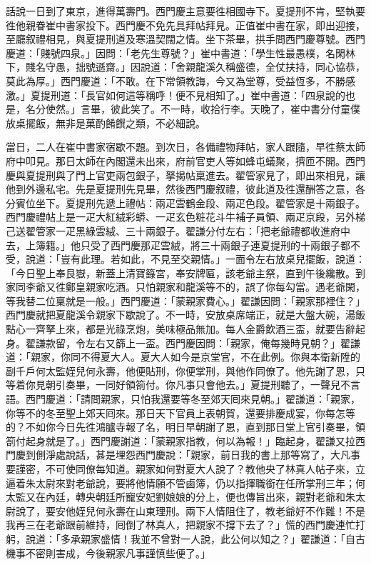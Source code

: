 話說一日到了東京，進得萬壽門。西門慶主意要徃相國寺下。夏提刑不肯，堅執要徃他親眷崔中書家投下。西門慶不免先具拜帖拜見。正值崔中書在家，即出迎接，至廳叙禮相見，與夏提刑道及寒溫契闊之情。坐下茶畢，拱手問西門慶尊號。西門慶道：「賤號四泉。」因問：「老先生尊號？」崔中書道：「學生性最愚樸，名閑林下，賤名守愚，拙號遜齋。」因說道：「舍親龍溪久稱盛德，全仗扶持，同心協恭，莫此為厚。」西門慶道：「不敢。在下常領教誨，今又為堂尊，受益恆多，不勝感激。」夏提刑道：「長官如何這等稱呼！便不見相知了。」崔中書道：「四泉說的也是，名分使然。」言畢，彼此笑了。不一時，收拾行李。天晚了，崔中書分付童僕放桌擺飯，無非是菓酌餚饌之類，不必細說。

當日，二人在崔中書家宿歇不題。到次日，各備禮物拜帖，家人跟隨，早徃蔡太師府中叩見。那日太師在內閣還未出來，府前官吏人等如蜂屯蟻聚，擠匝不開。西門慶與夏提刑與了門上官吏兩包銀子，拏揭帖稟進去。翟管家見了，即出來相見，讓他到外邊私宅。先是夏提刑先見畢，然後西門慶叙禮，彼此道及徃還酬答之意，各分賓位坐下。夏提刑先遞上禮帖：兩疋雲鶴金段、兩疋色段。翟管家是十兩銀子。西門慶禮帖上是一疋大紅絨彩蟒、一疋玄色粧花斗牛補子員領、兩疋京段，另外梯己送翟管家一疋黑綠雲絨、三十兩銀子。{}翟謙分付左右：「把老爺禮都收進府中去，上簿籍。」他只受了西門慶那疋雲絨，將三十兩銀子連夏提刑的十兩銀子都不受，說道：「豈有此理。若如此，不見至交親情。」一面令左右放桌兒擺飯，說道：「今日聖上奉艮嶽，新蓋上清寶籙宮，奉安牌匾，該老爺主祭，直到午後纔散。到家同李爺又徃鄭皇親家吃酒。只怕親家和龍溪等不的，誤了你每勾當。遇老爺閑，等我替二位稟就是一般。」西門慶道：「蒙親家費心。」翟謙因問：「親家那裡住？」西門慶就把夏龍溪令親家下歇說了。不一時，安放桌席端正，就是大盤大碗，湯飯點心一齊拏上來，都是光祿烹炮，美味極品無加。每人金爵飲酒三盃，就要告辭起身。翟謙款留，令左右又篩上一盃。西門慶因問：「親家，俺每幾時見朝？」翟謙道：「親家，你同不得夏大人。夏大人如今是京堂官，不在此例。你與本衛新陞的副千戶何太監姪兒何永壽，他便貼刑，你便掌刑，與他作同僚了。他先謝了恩，只等着你見朝引奏畢，一同好領箚付。你凡事只會他去。」夏提刑聽了，一聲兒不言語。西門慶道：「請問親家，只怕我還要等冬至郊天囘來見朝。」翟謙道：「親家，你等不的冬至聖上郊天囘來。那日天下官員上表朝賀，還要排慶成宴，你每怎等的？不如你今日先徃鴻臚寺報了名，明日早朝謝了恩，直到那日堂上官引奏畢，領箚付起身就是了。」西門慶謝道：「蒙親家指教，何以為報！」臨起身，翟謙又拉西門慶到側淨處說話，{}甚是埋怨西門慶說：「親家，前日我的書上那等寫了，大凡事要謹密，不可使同僚每知道。親家如何對夏大人說了？{}教他央了林真人帖子來，立逼着朱太尉來對老爺說，{}要將他情願不管鹵簿，仍以指揮職銜在任所掌刑三年；何太監又在內廷，轉央朝廷所寵安妃劉娘娘的分上，便也傳旨出來，親對老爺和朱太尉說了，要安他姪兒何永壽在山東理刑。兩下人情阻住了，教老爺好不作難！不是我再三在老爺跟前維持，囘倒了林真人，把親家不撐下去了？」慌的西門慶連忙打躬，說道：「多承親家盛情！我並不曾對一人說，此公何以知之？」翟謙道：「自古機事不密則害成，今後親家凡事謹慎些便了。」

